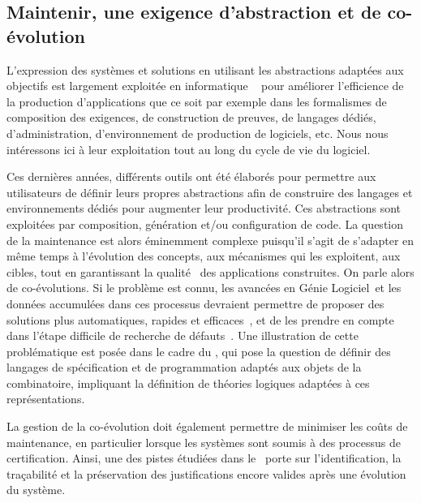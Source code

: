 \documentclass[11pt]{article}
\newcommand{\GL}[0]{Génie Logiciel\xspace}
\newcommand{\defi}[1]{\cite[défi]{#1}}
\begin{document}
\subsection{Maintenir, une exigence d'abstraction et de co-évolution\label{ss:maintenance:abstractions}}
L'expression des systèmes et solutions en utilisant les abstractions adaptées aux %
objectifs est largement exploitée en informatique ~\cite{DBLP:journals/sigcse/Gurer02} pour améliorer l'efficience de la production d'applications que ce soit par exemple dans les formalismes de composition des exigences, de construction de preuves, de langages dédiés, d'administration, d'environnement de production de logiciels, etc. Nous nous intéressons ici à leur exploitation tout au long du cycle de vie du logiciel.



Ces dernières années, différents outils ont été élaborés pour permettre aux utilisateurs de définir leurs  propres abstractions afin de construire des langages et environnements dédiés pour augmenter leur productivité. Ces abstractions sont exploitées par composition, génération et/ou configuration de code. La question de la maintenance est alors éminemment complexe puisqu'il s'agit de s'adapter en même temps à l'évolution des concepts, aux mécanismes qui les exploitent, aux cibles, tout en garantissant la \og qualité \fg~des applications construites. On parle alors de co-évolutions. Si le problème est connu, les avancées en \GL~et les données accumulées dans ces processus devraient permettre de proposer des solutions plus automatiques, rapides et efficaces~\defi{coevolution}, et de les prendre en compte dans l'étape difficile de recherche de défauts~\defi{debuggers}. Une illustration de cette problématique est posée dans le cadre du \defi{combinatoire}, qui pose la question de définir des langages de spécification et de programmation adaptés aux objets de la combinatoire, impliquant la définition de théories logiques adaptées à ces représentations.


La gestion de la co-évolution doit également permettre de minimiser les coûts de maintenance, en particulier lorsque les systèmes sont soumis à des processus de certification. Ainsi, une des pistes étudiées dans le~\defi{argumentation} porte sur l'identification, la traçabilité et la préservation des justifications encore valides après une évolution du système. 
\end{document}
